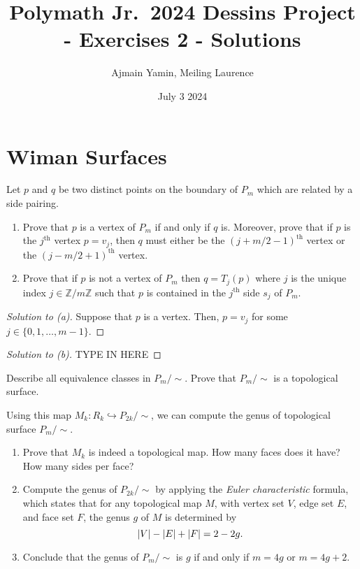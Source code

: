 \documentclass{article}
\title{Polymath Jr.\ 2024 Dessins Project - Exercises 2 - Solutions}
\author{Ajmain Yamin, Meiling Laurence}
\date{July 3 2024}
\begin{document}
\maketitle

\section{Wiman Surfaces}

\begin{exercise}  Let $p$ and $q$ be two distinct points on the boundary of $P_m$ which are related by a side pairing.
\begin{enumerate}
\item[(a)] Prove that $p$ is a vertex of $P_m$ if and only if $q$ is.  Moreover, prove that if $p$ is the $j^\text{th}$ vertex $p = v_j$, then $q$ must either be the $(j+m/2-1)^\text{th}$ vertex or the $(j-m/2+1)^\text{th}$ vertex.
\item[(b)] Prove that if $p$ is not a vertex of $P_m$ then $q = T_j(p)$ where $j$ is the unique index $j\in \mathbb{Z}/m\mathbb{Z}$ such that $p$ is contained in the $j^\text{th}$ side $s_j$ of $P_m$.
\end{enumerate}
\end{exercise}

\begin{proof}[Solution to (a)]
Suppose that \( p \) is a vertex. Then, \( p = v_j \) for some \( j  \in \{0, 1, \dots, m-1\}\).
\end{proof}

\begin{proof}[Solution to (b)]
TYPE IN HERE
\end{proof}

\begin{exercise}
Describe all equivalence classes in $P_m/{\sim}$. Prove that $P_m/{\sim}$ is a topological surface.
\end{exercise}

\begin{exercise}
Using this map $M_k :R_k \hookrightarrow P_{2k}/{\sim}$, we can compute the genus of topological surface $P_{m}/{\sim}$.
\begin{enumerate}
    \item[(a)] Prove that $M_k$ is indeed a topological map.  How many faces does it have?  How many sides per face?
    \item[(b)] Compute the genus of $P_{2k}/{\sim}$ by applying the \emph{Euler characteristic} formula, which states that for any topological map $M$, with vertex set $V$, edge set $E$, and face set $F$, the genus $g$ of $M$ is determined by $$\abs{V} - \abs{E} + \abs{F} = 2 - 2g.$$
    \item[(c)] Conclude that the genus of $P_m/{\sim}$ is $g$ if and only if $m = 4g$ or $m=4g+2$.
\end{enumerate}
\end{exercise}
\end{document}
